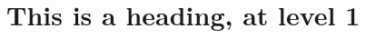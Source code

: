 \documentclass[a4paper]{report}
\begin{document}
\chapter{This is a heading, at level 1}
\end{document}
